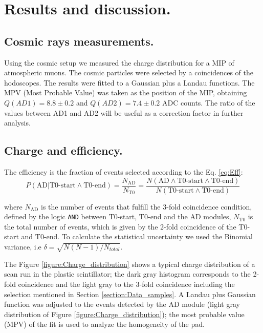 \section{Results and discussion.}

	\subsection{Cosmic rays measurements.}
	
	Using the cosmic setup we measured the charge distribution for a MIP of atmospheric muons. %
	The	cosmic particles were selected by a coincidences of the hodoscopes.
	The results were fitted to a Gaussian plus a Landau functions. The MPV (Most Probable Value)
	was taken as the position of the MIP, obtaining $Q(AD1)=8.8\pm0.2$ and $Q(AD2)=7.4\pm0.2$ ADC counts. The 
	ratio of the values between AD1 and AD2 will be useful as a correction factor in further analysis. 

  \subsection{Charge and efficiency.}
  The efficiency is the fraction of events selected according to the Eq. \ref{eq:Eff}:
	\begin{equation}\label{eq:Eff}
		P(\textrm{AD}|\text{T0-start} \wedge \text{T0-end})
		= \frac{N_{\text{AD}}}{N_\text{T0}}
		=\frac{ N(\textrm{AD} \wedge \textrm{T0-start}\wedge \textrm{T0-end})}
		{N(\textrm{T0-start}\wedge \textrm{T0-end} )}
	\end{equation}
	
    where $N_{\text{AD}}$ is the number of events that fulfill the 3-fold 
    coincidence condition, defined by the logic 
    \texttt{AND} between T0-start, T0-end and the AD modules, $N_{\text{T0}}$ 
    is the total number of events, which is given by the 2-fold coincidence 
    of the T0-start and T0-end. 
	To calculate the statistical 
	uncertainty we used the Binomial variance, i.e $\delta=\sqrt{N(N-1)/N_{total}}$. 

	The Figure \ref{figure:Charge_distribution} shows a typical charge distribution of a scan run in the 
	plastic scintillator; the dark gray	histogram corresponds to the 2-fold coincidence and the light gray to the
	3-fold coincidence including the selection mentioned in Section \ref{section:Data_samples}. A Landau plus Gaussian function was adjusted to the events detected by the AD module
	(light gray distribution of Figure \ref{figure:Charge_distribution}); the 
	most probable value (MPV) of the fit  is used to analyze the homogeneity 
	of the pad. %
	
